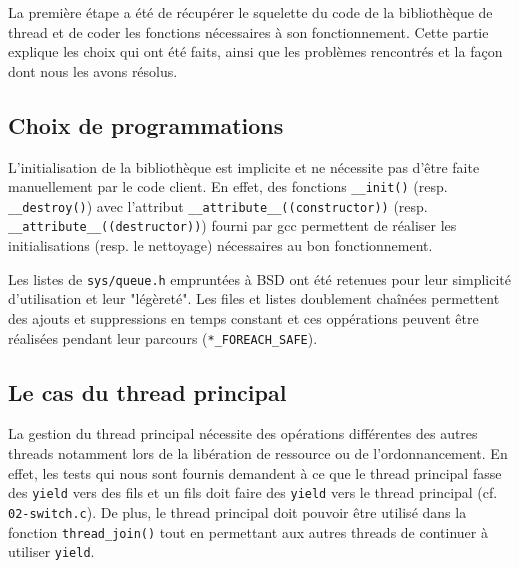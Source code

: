 La première étape a été de récupérer le squelette du code de la bibliothèque de
thread et de coder les fonctions nécessaires à son fonctionnement. Cette partie
explique les choix qui ont été faits, ainsi que les problèmes rencontrés et la
façon dont nous les avons résolus.

\subsection{Choix de programmations}

L'initialisation de la bibliothèque est implicite et ne nécessite pas d'être
faite manuellement par le code client. En effet, des fonctions \verb!__init()!
(resp. \verb!__destroy()!) avec l'attribut \verb!__attribute__((constructor))!
(resp. \verb!__attribute__((destructor))!) fourni par gcc permettent de
réaliser les initialisations (resp. le nettoyage) nécessaires au bon
fonctionnement.

Les listes de \verb!sys/queue.h! empruntées à BSD ont été retenues pour leur
simplicité d'utilisation et leur "légèreté". Les files et listes doublement
chaînées permettent des ajouts et suppressions en temps constant et ces
oppérations peuvent être réalisées pendant leur parcours
(\verb!*_FOREACH_SAFE!).


\subsection{Le cas du thread principal}

La gestion du thread principal nécessite des opérations différentes des autres
threads notamment lors de la libération de ressource ou de l'ordonnancement. En
effet, les tests qui nous sont fournis demandent à ce que le thread principal
fasse des \verb!yield! vers des fils et un fils doit faire des \verb!yield!
vers le thread principal (cf. \verb!02-switch.c!). De plus, le thread principal
doit pouvoir être utilisé dans la fonction \verb!thread_join()! tout en
permettant aux autres threads de continuer à utiliser \verb!yield!.
